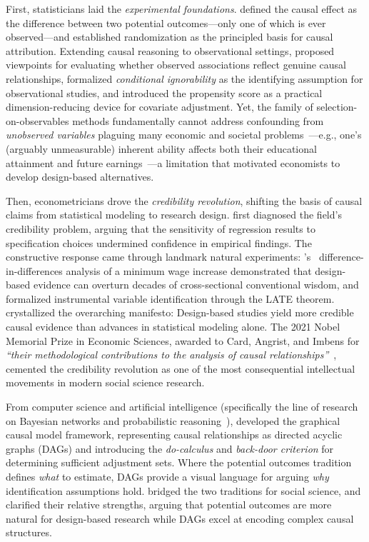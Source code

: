 First, statisticians laid the \emph{experimental foundations}.
\citet{neyman1923application} defined the causal effect as the difference between two potential outcomes---only one of which is ever observed---and \citet{fisher1935design} established randomization as the principled basis for causal attribution.
Extending causal reasoning to observational settings, \citet{hill1965environment} proposed viewpoints for evaluating whether observed associations reflect genuine causal relationships, \citet{rubin1974estimating} formalized \emph{conditional ignorability} as the identifying assumption for observational studies, and \citet{rosenbaum1983central} introduced the propensity score as a practical dimension-reducing device for covariate adjustment.
Yet, the family of selection-on-observables methods fundamentally cannot address confounding from \emph{unobserved variables} plaguing many economic and societal problems~\cite{heckman1979sample}---e.g., one's (arguably unmeasurable) inherent ability affects both their educational attainment and future earnings~\cite{card1999causal}---a limitation that motivated economists to develop design-based alternatives.

Then, econometricians drove the \emph{credibility revolution}, shifting the basis of causal claims from statistical modeling to research design.
\citet{leamer1983let} first diagnosed the field's credibility problem, arguing that the sensitivity of regression results to specification choices undermined confidence in empirical findings.
The constructive response came through landmark natural experiments: \citeauthor{card1994minimum}'s~\cite{card1994minimum} difference-in-differences analysis of a minimum wage increase demonstrated that design-based evidence can overturn decades of cross-sectional conventional wisdom, and \citet{angrist1996identification} formalized instrumental variable identification through the LATE theorem.
\citet{angrist2010credibility} crystallized the overarching manifesto: Design-based studies yield more credible causal evidence than advances in statistical modeling alone.
The 2021 Nobel Memorial Prize in Economic Sciences, awarded to Card, Angrist, and Imbens for \emph{``their methodological contributions to the analysis of causal relationships''}~\cite{nobelprize2021economics}, cemented the credibility revolution as one of the most consequential intellectual movements in modern social science research.

From computer science and artificial intelligence (specifically the line of research on Bayesian networks and probabilistic reasoning~\cite{pearl1988probabilistic}), \citet{pearl2009causality} developed the graphical causal model framework, representing causal relationships as directed acyclic graphs (DAGs) and introducing the \emph{do-calculus} and \emph{back-door criterion} for determining sufficient adjustment sets.
Where the potential outcomes tradition defines \emph{what} to estimate, DAGs provide a visual language for arguing \emph{why} identification assumptions hold.
\citet{morgan2015counterfactuals} bridged the two traditions for social science, and \citet{imbens2020potential} clarified their relative strengths, arguing that potential outcomes are more natural for design-based research while DAGs excel at encoding complex causal structures.

